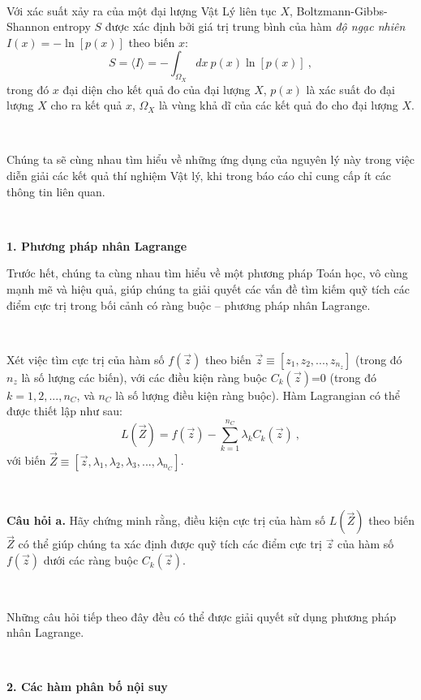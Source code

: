 \ \ 

Với xác suất xảy ra của một đại lượng Vật Lý liên tục $X$, Boltzmann-Gibbs-Shannon entropy $S$ được xác định bởi giá trị trung bình của hàm \textit{độ ngạc nhiên} $I(x)=-\ln\left[ p(x)\right]$ theo biến $x$:
\begin{equation}
    S = \langle I \rangle = - \int_{\Omega_X} dx \ p(x) \ln\left[ p(x)\right] \ ,
\end{equation}
trong đó $x$ đại diện cho kết quả đo của đại lượng $X$, $p(x)$ là xác suất đo đại lượng $X$ cho ra kết quả $x$,  $\Omega_X$ là vùng khả dĩ của các kết quả đo cho đại lượng $X$.

\ \  

Chúng ta sẽ cùng nhau tìm hiểu về những ứng dụng của nguyên lý này trong việc diễn giải các kết quả thí nghiệm Vật lý, khi trong báo cáo chỉ cung cấp ít các thông tin liên quan.

\ \  

\textbf{1. Phương pháp nhân Lagrange}

Trước hết, chúng ta cùng nhau tìm hiểu về một phương pháp Toán học, vô cùng mạnh mẽ và hiệu quả, giúp chúng ta giải quyết các vấn đề tìm kiếm quỹ tích các điểm cực trị trong bối cảnh có ràng buộc -- phương pháp nhân Lagrange.

\ \ 

Xét việc tìm cực trị của hàm số $f(\vec{z})$ theo biến $\vec{z}\equiv [z_1, z_2, ..., z_{n_z}]$ (trong đó $n_z$ là số lượng các biến), với các điều kiện ràng buộc $C_k(\vec{z})$=0 (trong đó $k=1,2,...,n_C$, và $n_C$ là số lượng điều kiện ràng buộc). Hàm Lagrangian có thể được thiết lập như sau:
\begin{equation}
    L(\vec{Z}) = f(\vec{z}) - \sum_{k=1}^{n_C} \lambda_k C_k(\vec{z}) \ ,
\end{equation}
với biến $\vec{Z} \equiv [\vec{z}, \lambda_1, \lambda_2, \lambda_3, ..., \lambda_{n_C}]$.

\ \ 

\textbf{Câu hỏi a.} Hãy chứng minh rằng, điều kiện cực trị của hàm số $L(\vec{Z})$ theo biến $\vec{Z}$ có thể giúp chúng ta xác định được quỹ tích các điểm cực trị $\vec{z}$ của hàm số $f(\vec{z})$ dưới các ràng buộc $C_k(\vec{z})$.

\ \  

Những câu hỏi tiếp theo đây đều có thể được giải quyết sử dụng phương pháp nhân Lagrange.

\ \  

\textbf{2. Các hàm phân bố nội suy}

